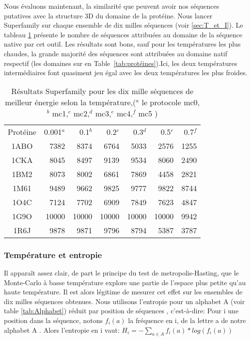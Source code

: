 Nous évaluons maintenant, la similarité que peuvent avoir nos séquences putatives avec la structure 3D du domaine de la protéine. Nous lancer Superfamily sur chaque ensemble de dix milles séquences (voir \ref{sec:T_et_I}). Le tableau \ref{tab:SF_mc} présente le nombre de séquences attribuées au domaine de la séquence native par cet outil. Les résultats sont bons, sauf pour les températures les plus chaudes, la grande majorité des séquences sont attribuées au domaine natif respectif (les domaines sur en Table~\ref{tab:protéines}).Ici, les deux températures intermédiaires font quasiment jeu égal avec les deux températures les plus froides.
    \begin{table}[!htbp]
      \centering
      
      \begin{tabular}{crrrrrr}      
        \toprule
         Protéine & 0.001$^a$ & 0.1$^b$ & 0.2$^c$  & 0.3$^d$ & 0.5$^e$ & 0.7$^f$  \\
        \cmidrule{1-7}
        1ABO & 7382  & 8374 & 6764 & 5033 & 2576  & 1255  \\      
        1CKA & 8045  & 8497 & 9139 & 9534 & 8060  & 2490  \\  
        1BM2 & 8073  & 8002 & 6861 & 7869 & 4458  & 2821  \\  
        1M61 & 9489  & 9662 & 9825 & 9777 & 9822  & 8744  \\  
        1O4C & 7124  & 7702 & 6909 & 7849 & 7623  & 4847  \\  
        1G9O & 10000 & 10000 & 10000 & 10000 & 10000  & 9942 \\  
        1R6J & 9878  & 9871 & 9796 & 8794 & 5387 & 3787 \\  

        \bottomrule
        
      \end{tabular}
      

      \caption{Résultats Superfamily pour les dix mille séquences de meilleur énergie selon la température,($^a$ le protocole mc0,$^b$ mc1,$^c$  mc2,$^d$ mc3,$^e$ mc4,$^f$ mc5 )}      
      \label{tab:SF_mc}
    \end{table}



   \subsubsection{Température et entropie} 

Il apparaît assez clair, de part le principe du test de metropolis-Hasting, que le Monte-Carlo à basse température explore une partie de l'espace plus petite qu'au haute température. Il est alors légitime de mesurer cet effet sur les ensembles de dix milles séquences obtenues. Nous utilisons l'entropie pour un alphabet A (voir table \ref{tab:Alphabet}) réduit par position de séquences , c'est-à-dire:
Pour i une position dans la séquence, notons $f_{i}(a)$ la fréquence en i, de la lettre a de notre alphabet A . Alors l'entropie en i vaut:
 $H_i=  - \sum_{a \in A} f_{i}(a) * log( f_{i}(a) ) $  

